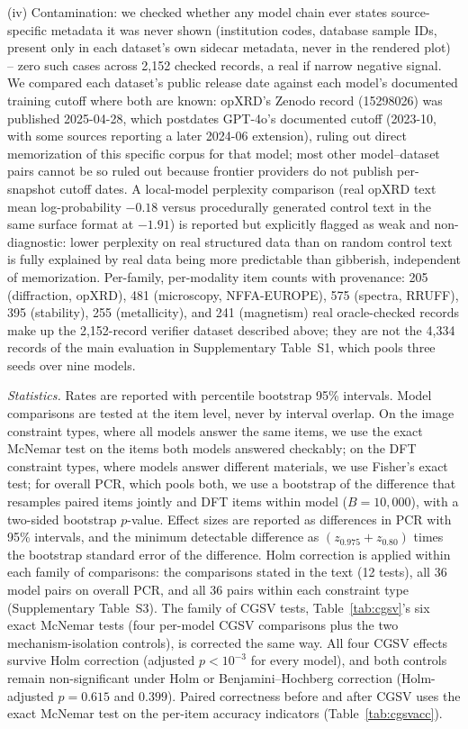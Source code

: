 \documentclass[pdflatex,sn-nature]{sn-jnl}
\newcommand{\rev}[1]{#1}
\newcommand{\rev}[1]{{\color{blue}#1}}
\begin{document}
(iv) Contamination: we checked whether any model chain ever
states source-specific metadata it was never shown (institution codes, database sample
IDs, present only in each dataset's own sidecar metadata, never in the rendered plot) --
zero such cases across 2{,}152 checked records, a real if narrow negative signal. We
compared each dataset's public release date against each model's documented training
cutoff where both are known: opXRD's Zenodo record (15298026) was published 2025-04-28,
which postdates GPT-4o's documented cutoff (2023-10, with some sources reporting a later
2024-06 extension), ruling out direct memorization of this specific corpus for that model;
most other model--dataset pairs cannot be so ruled out because frontier providers do not
publish per-snapshot cutoff dates. A local-model perplexity comparison (real opXRD text
mean log-probability $-0.18$ versus procedurally generated control text in the same surface
format at $-1.91$) is reported but explicitly flagged as weak and non-diagnostic: lower
perplexity on real structured data than on random control text is fully explained by real
data being more predictable than gibberish, independent of memorization. Per-family,
per-modality item counts with provenance: 205 (diffraction, opXRD), 481 (microscopy,
NFFA-EUROPE), 575 (spectra, RRUFF), 395 (stability), 255 (metallicity), and 241 (magnetism)
real oracle-checked records make up the 2{,}152-record verifier dataset described above;
they are not the \rev{4{,}334} records of the main evaluation in Supplementary Table~S1, which
pools three seeds over nine models.

\noindent\emph{Statistics.} \rev{Rates are reported with percentile bootstrap 95\% intervals. Model
comparisons are tested at the item level, never by interval overlap. On the image constraint types,
where all models answer the same items, we use the exact McNemar test on the items both models
answered checkably; on the DFT constraint types, where models answer different materials, we use
Fisher's exact test; for overall PCR, which pools both, we use a bootstrap of the difference that
resamples paired items jointly and DFT items within model ($B=10{,}000$), with a two-sided bootstrap
$p$-value. Effect sizes are reported as differences in PCR with 95\% intervals, and the minimum
detectable difference as $(z_{0.975}+z_{0.80})$ times the bootstrap standard error of the
difference. Holm correction is applied within each family of comparisons: the comparisons stated in
the text (12 tests), all 36 model pairs on overall PCR, and all 36 pairs within each constraint type
(Supplementary Table~S3).} The family of CGSV tests, Table~\ref{tab:cgsv}'s six exact McNemar tests (four per-model CGSV comparisons plus the two
mechanism-isolation controls), \rev{is corrected the same way}. All four CGSV effects survive
Holm correction (adjusted $p<10^{-3}$ for every model), and
both controls remain non-significant under \rev{Holm or Benjamini--Hochberg} correction (Holm-adjusted
$p=0.615$ and $0.399$). \rev{Paired correctness before and after CGSV uses the exact McNemar test on
the per-item accuracy indicators (Table~\ref{tab:cgsvacc}).}
\end{document}

